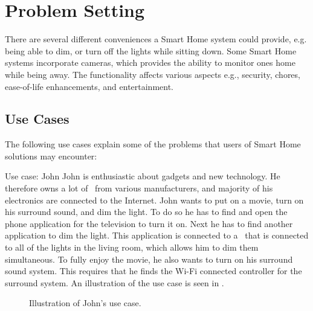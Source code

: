  \section{Problem Setting} \label{sec:problem-description}
There are several different conveniences a Smart Home system could provide, e.g. being able to dim, or turn off the lights while sitting down.
Some Smart Home systems incorporate cameras, which provides the ability to monitor ones home while being away.
The functionality affects various aspects e.g., security, chores, ease-of-life enhancements, and entertainment.

\subsection{Use Cases}\label{sec:use-cases}
The following use cases explain some of the problems that users of Smart Home solutions may encounter:

\begin{colbox}{Use case: John}
John is enthusiastic about gadgets and new technology. He therefore owns a lot of \sdevs~from various manufacturers, and majority of his electronics are connected to the Internet. John wants to put on a movie, turn on his surround sound, and dim the light. To do so he has to find and open the phone application for the television to turn it on. Next he has to find another application to dim the light. This application is connected to a \hub~that is connected to all of the lights in the living room, which allows him to dim them simultaneous. To fully enjoy the movie, he also wants to turn on his surround sound system. This requires that he finds the Wi-Fi connected controller for the surround system. An illustration of the use case is seen in  .
\end{colbox}

\begin{figure}[H]
     \caption{\label{fig:use-case-1} Illustration of John's use case.}
\end{figure}



